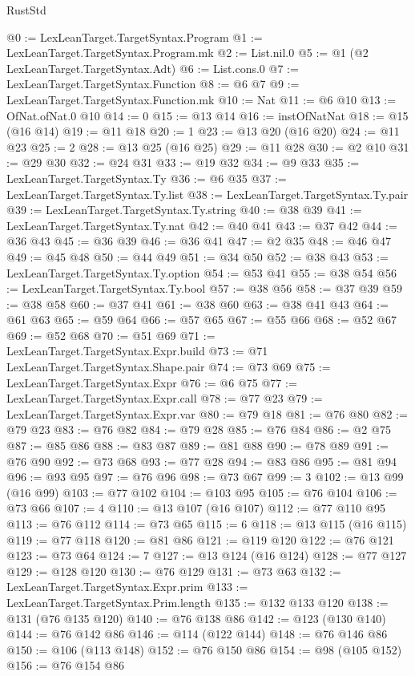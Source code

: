\begin{lexlean}{RustStd}
\begin{coremodule}
@0 := LexLeanTarget.TargetSyntax.Program
@1 := LexLeanTarget.TargetSyntax.Program.mk
@2 := List.nil.{0}
@5 := @1 (@2 LexLeanTarget.TargetSyntax.Adt)
@6 := List.cons.{0}
@7 := LexLeanTarget.TargetSyntax.Function
@8 := @6 @7
@9 := LexLeanTarget.TargetSyntax.Function.mk
@10 := Nat
@11 := @6 @10
@13 := OfNat.ofNat.{0} @10
@14 := 0
@15 := @13 @14
@16 := instOfNatNat
@18 := @15 (@16 @14)
@19 := @11 @18
@20 := 1
@23 := @13 @20 (@16 @20)
@24 := @11 @23
@25 := 2
@28 := @13 @25 (@16 @25)
@29 := @11 @28
@30 := @2 @10
@31 := @29 @30
@32 := @24 @31
@33 := @19 @32
@34 := @9 @33
@35 := LexLeanTarget.TargetSyntax.Ty
@36 := @6 @35
@37 := LexLeanTarget.TargetSyntax.Ty.list
@38 := LexLeanTarget.TargetSyntax.Ty.pair
@39 := LexLeanTarget.TargetSyntax.Ty.string
@40 := @38 @39
@41 := LexLeanTarget.TargetSyntax.Ty.nat
@42 := @40 @41
@43 := @37 @42
@44 := @36 @43
@45 := @36 @39
@46 := @36 @41
@47 := @2 @35
@48 := @46 @47
@49 := @45 @48
@50 := @44 @49
@51 := @34 @50
@52 := @38 @43
@53 := LexLeanTarget.TargetSyntax.Ty.option
@54 := @53 @41
@55 := @38 @54
@56 := LexLeanTarget.TargetSyntax.Ty.bool
@57 := @38 @56
@58 := @37 @39
@59 := @38 @58
@60 := @37 @41
@61 := @38 @60
@63 := @38 @41 @43
@64 := @61 @63
@65 := @59 @64
@66 := @57 @65
@67 := @55 @66
@68 := @52 @67
@69 := @52 @68
@70 := @51 @69
@71 := LexLeanTarget.TargetSyntax.Expr.build
@73 := @71 LexLeanTarget.TargetSyntax.Shape.pair
@74 := @73 @69
@75 := LexLeanTarget.TargetSyntax.Expr
@76 := @6 @75
@77 := LexLeanTarget.TargetSyntax.Expr.call
@78 := @77 @23
@79 := LexLeanTarget.TargetSyntax.Expr.var
@80 := @79 @18
@81 := @76 @80
@82 := @79 @23
@83 := @76 @82
@84 := @79 @28
@85 := @76 @84
@86 := @2 @75
@87 := @85 @86
@88 := @83 @87
@89 := @81 @88
@90 := @78 @89
@91 := @76 @90
@92 := @73 @68
@93 := @77 @28
@94 := @83 @86
@95 := @81 @94
@96 := @93 @95
@97 := @76 @96
@98 := @73 @67
@99 := 3
@102 := @13 @99 (@16 @99)
@103 := @77 @102
@104 := @103 @95
@105 := @76 @104
@106 := @73 @66
@107 := 4
@110 := @13 @107 (@16 @107)
@112 := @77 @110 @95
@113 := @76 @112
@114 := @73 @65
@115 := 6
@118 := @13 @115 (@16 @115)
@119 := @77 @118
@120 := @81 @86
@121 := @119 @120
@122 := @76 @121
@123 := @73 @64
@124 := 7
@127 := @13 @124 (@16 @124)
@128 := @77 @127
@129 := @128 @120
@130 := @76 @129
@131 := @73 @63
@132 := LexLeanTarget.TargetSyntax.Expr.prim
@133 := LexLeanTarget.TargetSyntax.Prim.length
@135 := @132 @133 @120
@138 := @131 (@76 @135 @120)
@140 := @76 @138 @86
@142 := @123 (@130 @140)
@144 := @76 @142 @86
@146 := @114 (@122 @144)
@148 := @76 @146 @86
@150 := @106 (@113 @148)
@152 := @76 @150 @86
@154 := @98 (@105 @152)
@156 := @76 @154 @86

\end{coremodule}
\end{lexlean}
